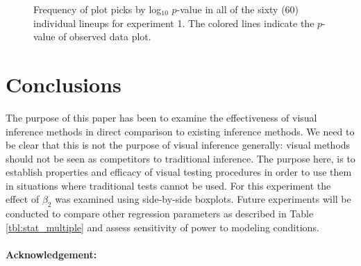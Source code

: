 \documentclass{article}
\begin{document}
\begin{figure}[hbtp]
   \centering
       \caption{Frequency of plot picks by log$_10$ $p$-value in all of the sixty (60) individual lineups for experiment 1. The colored lines indicate the $p$-value of observed data plot.}
       \label{fig:P-val_log}
\end{figure}


\section{Conclusions}

The purpose of this paper has been to examine the effectiveness of visual inference methods in direct comparison to existing inference methods. We need to be clear that this is not the purpose of visual inference generally: visual methods should not be seen as competitors to traditional inference.  The purpose here, is to  establish properties and  efficacy of visual testing procedures in order to use them in situations where traditional tests cannot be used. For this experiment the effect of $\beta_2$ was examined using side-by-side boxplots. Future experiments will be conducted to compare other regression parameters as described in Table \ref{tbl:stat_multiple} and assess sensitivity of power to modeling conditions.

\paragraph{Acknowledgement:}
\end{document}
